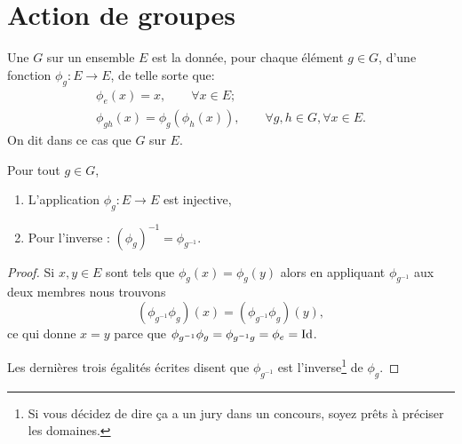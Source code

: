 \section{Action de groupes}

\begin{definition}  \label{DefActionGroupe}
    Une  \( G\) sur un ensemble \( E\) est la donnée, pour chaque élément \( g \in G\), d'une fonction \(\phi_g : E \to E \), de telle sorte que:
    \begin{gather*}
        \phi_{e}(x) = x, \hspace{2em} \forall x \in E;\\
        \phi_{gh}(x) = \phi_g (\phi_h (x)),  \hspace{2em} \forall g,h \in G, \forall x \in E.
     \end{gather*}
     On dit dans ce cas que \( G \)  sur \( E \).
\end{definition}

\begin{lemma}
    Pour tout \( g\in G\),
    \begin{enumerate}
        \item
            L'application \( \phi_g\colon E\to E\) est injective,
        \item
            Pour l'inverse : \( (\phi_g)^{-1}=\phi_{g^{-1}}\).
    \end{enumerate}
\end{lemma}

\begin{proof}
    Si \( x,y\in E\) sont tels que \( \phi_g(x)=\phi_g(y)\) alors en appliquant \( \phi_{g^{-1}}\) aux deux membres nous trouvons
    \begin{equation}
        (\phi_{g^{-1}}\phi_g)(x)=(\phi_{g^{-1}}\phi_g)(y),
    \end{equation}
    ce qui donne \( x=y\) parce que \( \phi_{g^{-1}}\phi_g=\phi_{g^{-1}g}=\phi_e=\operatorname{Id}\).

    Les dernières trois égalités écrites disent que \( \phi_{g^{-1}}\) est l'inverse\footnote{Si vous décidez de dire ça a un jury dans un concours, soyez prêts à préciser les domaines.} de \( \phi_g\).
\end{proof}

